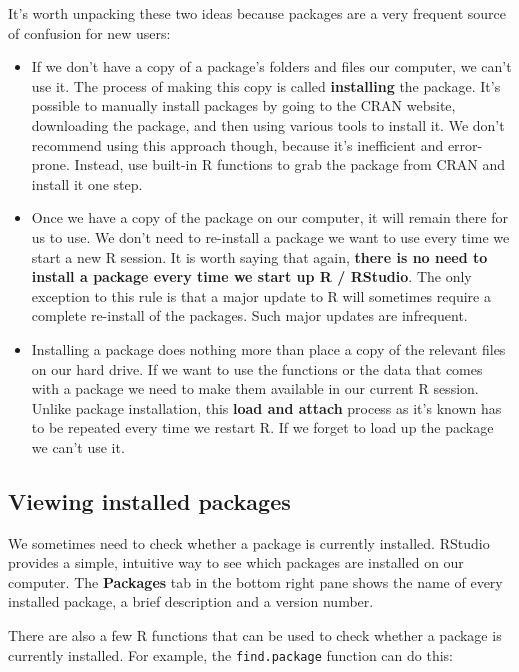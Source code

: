 \documentclass[
]{book}
\begin{document}
It's worth unpacking these two ideas because packages are a very frequent source of confusion for new users:

\begin{itemize}
\item
  If we don't have a copy of a package's folders and files our computer, we can't use it. The process of making this copy is called \textbf{installing} the package. It's possible to manually install packages by going to the CRAN website, downloading the package, and then using various tools to install it. We don't recommend using this approach though, because it's inefficient and error-prone. Instead, use built-in R functions to grab the package from CRAN and install it one step.
\item
  Once we have a copy of the package on our computer, it will remain there for us to use. We don't need to re-install a package we want to use every time we start a new R session. It is worth saying that again, \textbf{there is no need to install a package every time we start up R / RStudio}. The only exception to this rule is that a major update to R will sometimes require a complete re-install of the packages. Such major updates are infrequent.
\item
  Installing a package does nothing more than place a copy of the relevant files on our hard drive. If we want to use the functions or the data that comes with a package we need to make them available in our current R session. Unlike package installation, this \textbf{load and attach} process as it's known has to be repeated every time we restart R. If we forget to load up the package we can't use it.
\end{itemize}

\hypertarget{viewing-installed-packages}{%
\subsection{Viewing installed packages}\label{viewing-installed-packages}}

We sometimes need to check whether a package is currently installed. RStudio provides a simple, intuitive way to see which packages are installed on our computer. The \textbf{Packages} tab in the bottom right pane shows the name of every installed package, a brief description and a version number.

There are also a few R functions that can be used to check whether a package is currently installed. For example, the \texttt{find.package} function can do this:
\end{document}
